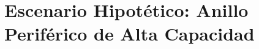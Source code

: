 %
%
%
\chapter{Escenario Hipotético: Anillo Periférico de Alta Capacidad}
\label{ch:analisis-red-anillo}






